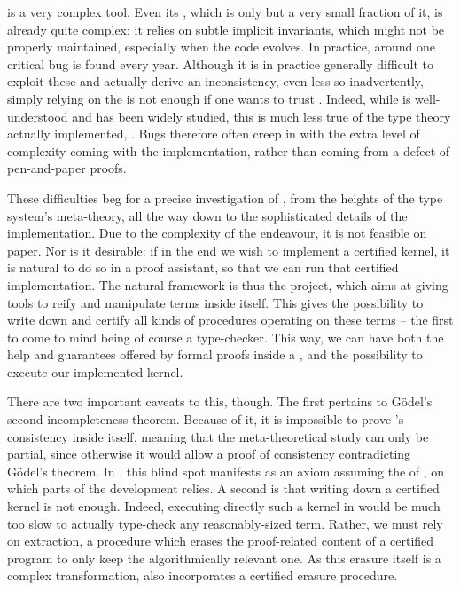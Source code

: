  is a very complex tool. Even its , which is only but a very small
fraction of it, is already quite complex: it relies on subtle implicit invariants, which
might not be properly maintained, especially when the code evolves.
In practice, around one critical bug is found every year.%
Although it is in practice generally difficult to exploit these
and actually derive an inconsistency,
even less so inadvertently, simply relying on the %
is not enough if one wants to trust .
Indeed, while  is well-understood and has been widely studied,
this is much less true of the type theory actually implemented, .
Bugs therefore often creep in with the extra level of complexity coming with the implementation,
rather than coming from a defect of pen-and-paper proofs.%

These difficulties beg for a precise investigation of , from the heights of the
type system’s meta-theory, all the way down to the sophisticated details of the implementation.
Due to the complexity of the endeavour, it is not feasible on paper. Nor is it
desirable: if in the end we wish to implement a certified kernel, it is natural to do so
in a proof assistant, so that we can run that certified implementation.
The natural framework is thus the  project,
which aims at giving tools to reify and manipulate  terms%
inside  itself. This gives the possibility to write down and certify
all kinds of procedures operating on these terms – the first to come to mind being of course
a type-checker. This way, we can have both the help and guarantees offered by
formal proofs inside a , and the possibility to execute
our implemented kernel.

There are two important caveats to this, though.
The first pertains to Gödel’s second incompleteness
theorem. Because of it, it is impossible to prove ’s consistency
inside  itself,
meaning that the meta-theoretical study can only be partial, since otherwise it would allow
a proof of consistency contradicting Gödel’s theorem. In
, this blind spot manifests as an axiom assuming the
 of , on which parts of the development relies.
A second is that writing down a certified kernel is not enough. Indeed, executing directly
such a kernel in  would be much too slow to actually type-check
any reasonably-sized term. Rather, we must rely on extraction, a procedure which erases the
proof-related content of a certified program to only keep the algorithmically relevant one.
As this erasure itself is a complex transformation,  also incorporates a certified
erasure procedure.

